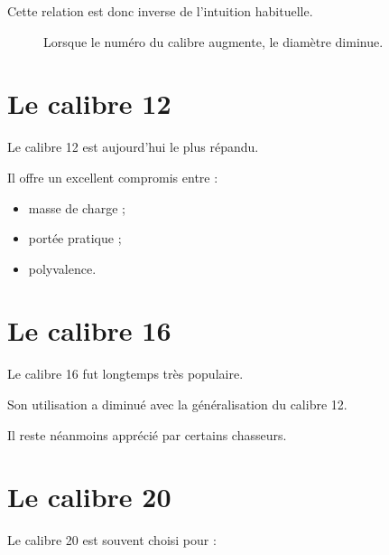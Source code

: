 Cette relation est donc inverse de l'intuition habituelle.

\begin{figure}[htbp]
\centering


\caption{Lorsque le numéro du calibre augmente, le diamètre diminue.}
\label{fig:diametres_calibres}

\end{figure}

\section{Le calibre 12}

Le calibre 12 est aujourd'hui le plus répandu.

Il offre un excellent compromis entre :

\begin{itemize}
    \item masse de charge ;
    \item portée pratique ;
    \item polyvalence.
\end{itemize}

\section{Le calibre 16}

Le calibre 16 fut longtemps très populaire.

Son utilisation a diminué avec la généralisation du calibre 12.

Il reste néanmoins apprécié par certains chasseurs.

\section{Le calibre 20}

Le calibre 20 est souvent choisi pour :

